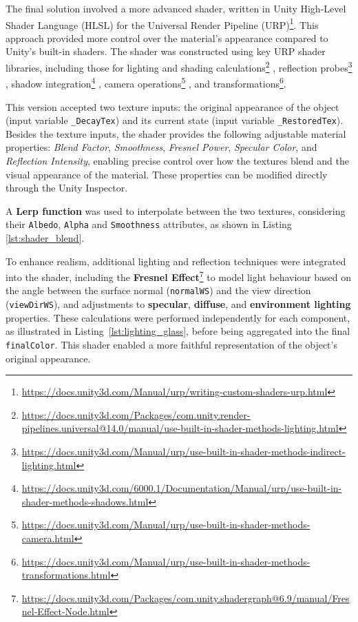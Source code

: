 The final solution involved a more advanced shader, written in Unity High-Level Shader Language (HLSL) for the Universal Render Pipeline (URP)\footnote{\url{https://docs.unity3d.com/Manual/urp/writing-custom-shaders-urp.html}}. 
This approach provided more control over the material's appearance compared to Unity's built-in shaders.
The shader was constructed using key URP shader libraries, including those for lighting and shading calculations\footnote{\url{https://docs.unity3d.com/Packages/com.unity.render-pipelines.universal@14.0/manual/use-built-in-shader-methods-lighting.html}}
, reflection probes\footnote{\url{https://docs.unity3d.com/Manual/urp/use-built-in-shader-methods-indirect-lighting.html}}
, shadow integration\footnote{\url{https://docs.unity3d.com/6000.1/Documentation/Manual/urp/use-built-in-shader-methods-shadows.html}}
, camera operations\footnote{\url{https://docs.unity3d.com/Manual/urp/use-built-in-shader-methods-camera.html}}
, and transformations\footnote{\url{https://docs.unity3d.com/Manual/urp/use-built-in-shader-methods-transformations.html}}.

This version accepted two texture inputs: the original appearance of the object (input variable \texttt{\_DecayTex}) and its current state (input variable \texttt{\_RestoredTex}).
Besides the texture inputs, the shader provides the following adjustable material properties: \emph{Blend Factor}, \emph{Smoothness}, \emph{Fresnel Power}, \emph{Specular Color}, and \emph{Reflection Intensity}, enabling precise control over how the textures blend and the visual appearance of the material. 
These properties can be modified directly through the Unity Inspector.

A \textbf{Lerp function} was used to interpolate between the two textures, considering their \texttt{Albedo}, \texttt{Alpha} and \texttt{Smoothness} attributes, as shown in Listing \ref{lst:shader_blend}. %

To enhance realism, additional lighting and reflection techniques were integrated into the shader, including 
the \textbf{Fresnel Effect}\footnote{\url{https://docs.unity3d.com/Packages/com.unity.shadergraph@6.9/manual/Fresnel-Effect-Node.html}} to model light behaviour based on the angle between the surface normal (\texttt{normalWS}) and the view direction (\texttt{viewDirWS}), 
and adjustments to \textbf{specular}, \textbf{diffuse}, and \textbf{environment lighting} properties. 
These calculations were performed independently for each component, as illustrated in Listing~\ref{lst:lighting_glass}, before being aggregated into the final \texttt{finalColor}. 
This shader enabled a more faithful representation of the object's original appearance.

